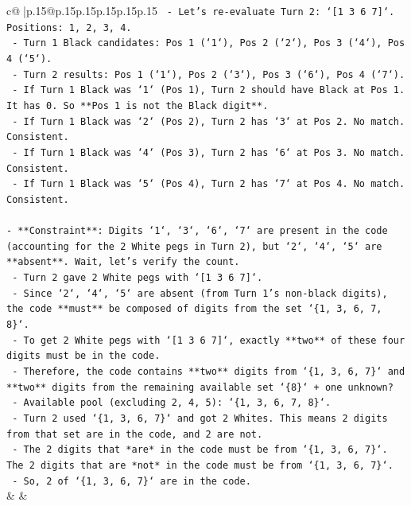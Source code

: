 \documentclass{article}
\begin{document}
{\begin{supertabular}{c@{$\;$}|p{.15\linewidth}@{}p{.15\linewidth}p{.15\linewidth}p{.15\linewidth}p{.15\linewidth}p{.15\linewidth}}
{{{\texttt{    {-} Let's re{-}evaluate Turn 2: `{[}1 3 6 7{]}`. Positions: 1, 2, 3, 4.} \\
\texttt{    {-} Turn 1 Black candidates: Pos 1 (`1`), Pos 2 (`2`), Pos 3 (`4`), Pos 4 (`5`).} \\
\texttt{    {-} Turn 2 results: Pos 1 (`1`), Pos 2 (`3`), Pos 3 (`6`), Pos 4 (`7`).} \\
\texttt{    {-} If Turn 1 Black was `1` (Pos 1), Turn 2 should have Black at Pos 1. It has 0. So **Pos 1 is not the Black digit**.} \\
\texttt{    {-} If Turn 1 Black was `2` (Pos 2), Turn 2 has `3` at Pos 2. No match. Consistent.} \\
\texttt{    {-} If Turn 1 Black was `4` (Pos 3), Turn 2 has `6` at Pos 3. No match. Consistent.} \\
\texttt{    {-} If Turn 1 Black was `5` (Pos 4), Turn 2 has `7` at Pos 4. No match. Consistent.} \\
\\ 
\texttt{{-} **Constraint**: Digits `1`, `3`, `6`, `7` are present in the code (accounting for the 2 White pegs in Turn 2), but `2`, `4`, `5` are **absent**. Wait, let's verify the count.} \\
\texttt{  {-} Turn 2 gave 2 White pegs with `{[}1 3 6 7{]}`.} \\
\texttt{  {-} Since `2`, `4`, `5` are absent (from Turn 1's non{-}black digits), the code **must** be composed of digits from the set `\{1, 3, 6, 7, 8\}`.} \\
\texttt{  {-} To get 2 White pegs with `{[}1 3 6 7{]}`, exactly **two** of these four digits must be in the code.} \\
\texttt{  {-} Therefore, the code contains **two** digits from `\{1, 3, 6, 7\}` and **two** digits from the remaining available set `\{8\}` + one unknown?} \\
\texttt{  {-} Available pool (excluding 2, 4, 5): `\{1, 3, 6, 7, 8\}`.} \\
\texttt{  {-} Turn 2 used `\{1, 3, 6, 7\}` and got 2 Whites. This means 2 digits from that set are in the code, and 2 are not.} \\
\texttt{  {-} The 2 digits that *are* in the code must be from `\{1, 3, 6, 7\}`. The 2 digits that are *not* in the code must be from `\{1, 3, 6, 7\}`.} \\
\texttt{  {-} So, 2 of `\{1, 3, 6, 7\}` are in the code.} \\
            }
        }
    }
    & & \\ \\


\end{supertabular}}
\end{document}
